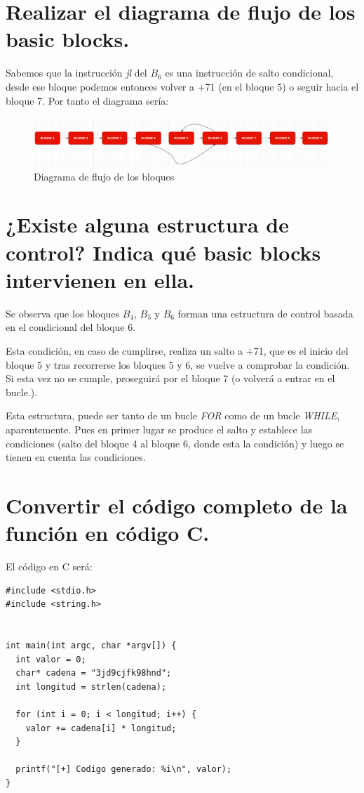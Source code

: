 \documentclass[12pt,twoside]{article}
\begin{document}
\section{Realizar el diagrama de flujo de los basic blocks.}
Sabemos que la instrucción \textit{jl} del $B_6$ es una instrucción de salto condicional, desde ese bloque podemos entonces volver a +71 (en el bloque 5) o seguir hacia el bloque 7. Por tanto el diagrama sería:
\begin{figure}[h]
    \centering
    \hspace*{-1cm} 
    \includegraphics[scale=0.5]{./imagenes/diagrama bloque}
    \caption{Diagrama de flujo de los bloques}
\end{figure}
\section{¿Existe alguna estructura de control? Indica qué basic blocks intervienen en ella.}
Se observa que los bloques $B_4$, $B_5$ y $B_6$ forman una estructura de control basada en el condicional del bloque 6.

Esta condición, en caso de cumplirse, realiza un salto a +71, que es el inicio del bloque 5 y tras recorrerse los bloques 5 y 6, se vuelve a comprobar la condición. Si esta vez no se cumple, proseguirá por el bloque 7 (o volverá a entrar en el bucle.).

Esta estructura, puede ser tanto de un bucle \textit{FOR} como de un bucle \textit{WHILE}, aparentemente. Pues en primer lugar se produce el salto y establece las condiciones (salto del bloque 4 al bloque 6, donde esta la condición) y luego se tienen en cuenta las condiciones.

\newpage
\section{Convertir el código completo de la función en código C.}
El código en C será:
\begin{verbatim}
#include <stdio.h>
#include <string.h>


int main(int argc, char *argv[]) {
  int valor = 0;
  char* cadena = "3jd9cjfk98hnd";
  int longitud = strlen(cadena);

  for (int i = 0; i < longitud; i++) {
    valor += cadena[i] * longitud;
  }
  
  printf("[+] Codigo generado: %i\n", valor);
} 
\end{verbatim}
\end{document}
